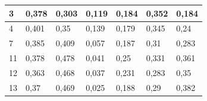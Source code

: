 \documentclass{classrep}
\begin{document}
{\begin{table}[H]
\begin{center}
\begin{tabular}{|l|l|l|l|l|l|l|}
3                                                        & 0,378                                                & 0,303                                                   & 0,119                                                    & 0,184                                                       & 0,352                                                   & 0,184                                                      \\ \hline
4                                                        & 0,401                                                & 0,35                                                    & 0,139                                                    & 0,179                                                       & 0,345                                                   & 0,24                                                       \\ \hline
7                                                        & 0,385                                                & 0,409                                                   & 0,057                                                    & 0,187                                                       & 0,31                                                    & 0,283                                                      \\ \hline
11                                                       & 0,378                                                & 0,478                                                   & 0,041                                                    & 0,25                                                        & 0,331                                                   & 0,361                                                      \\ \hline
12                                                       & 0,363                                                & 0,468                                                   & 0,037                                                    & 0,231                                                       & 0,283                                                   & 0,35                                                       \\ \hline
13                                                       & 0,37                                                 & 0,469                                                   & 0,025                                                    & 0,188                                                       & 0,29                                                    & 0,382                                                      \\ \hline

\end{tabular}
\end{center}
\end{table}}
\end{document}
